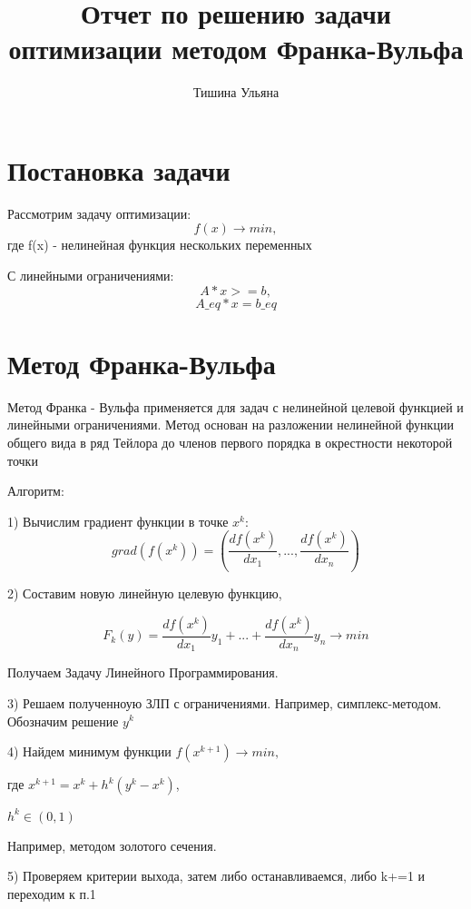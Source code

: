 \documentclass{article}
\title{Отчет по решению задачи оптимизации методом Франка-Вульфа}
\author{Тишина Ульяна}
\begin{document}
\maketitle

\newpage
\tableofcontents


\newpage
\section{Постановка задачи}
Рассмотрим задачу оптимизации:
\begin{equation}
f(x)  \rightarrow min,
\end{equation}
где f(x) - нелинейная функция нескольких переменных

С линейными ограничениями:
\begin{equation}
A * x >= b,
\end{equation}
\begin{equation}
A\_eq * x = b\_eq
\end{equation}

\section{Метод Франка-Вульфа}
Метод Франка - Вульфа применяется для задач с нелинейной целевой функцией и линейными ограничениями. Метод основан на разложении нелинейной функции общего вида в ряд Тейлора до членов первого порядка в окрестности некоторой точки

Алгоритм:

1) Вычислим градиент функции в точке $x^k$:
$$grad(f(x^k)) = (\frac{df(x^k)}{dx_1},...,\frac{df(x^k)}{dx_n})$$

2) Составим новую линейную целевую функцию,

$$F_k(y) = \frac{df(x^k)}{dx_1} y_1 + ... + \frac{df(x^k)}{dx_n} y_n \rightarrow min$$

Получаем Задачу Линейного Программирования.

3) Решаем полученноую ЗЛП с ограничениями. Например, симплекс-методом. Обозначим решение $y^k$

4) Найдем минимум функции $f(x^{k+1}) \rightarrow min,$

где $x^{k+1} = x^k + h^k (y^k - x^k)$, 

 $h^k \in (0, 1)$

Например, методом золотого сечения.

5) Проверяем критерии выхода, затем либо останавливаемся, либо k+=1 и переходим к п.1

\newpage
\end{document}
